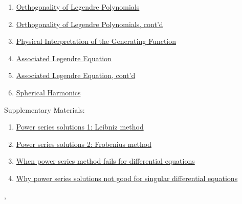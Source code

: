 \documentclass[11pt]{article}
\renewcommand{\today}{\shortmonthname[\the\month] \the \day,  \the\year}
\begin{document}
\begin{enumerate}
	\item \href{https://mp.weixin.qq.com/s/HDWGrbzTWtbSsO3xZgVeeg}{Orthogonality of Legendre Polynomials}	%
	\item \href{https://mp.weixin.qq.com/s/H7WozThNHJAqmupvJf8H-A}{Orthogonality of Legendre Polynomials, cont'd}	%
	\item \href{https://mp.weixin.qq.com/s/MLn-V3pYs6BsIvyyuxJmKQ}{Physical Interpretation of the Generating Function}	%
	\item \href{https://mp.weixin.qq.com/s/37o2x9AJsUX-z2VeGALH6A}{Associated Legendre Equation}	%
	\item \href{https://mp.weixin.qq.com/s/aU9Za7cqDEPJbBFrfZOFAg}{Associated Legendre Equation, cont'd}	%
	\item \href{https://mp.weixin.qq.com/s/aurUWxJnuPOFeSZ-_2Wz9A}{Spherical Harmonics}	%
\end{enumerate}

\begin{center}
	Supplementary Materials:
\end{center}

\vspace{-0.75cm}

\begin{enumerate}
	\item \href{https://mp.weixin.qq.com/s/x_w2FTPsPcHFCVHrc3_6lA}{Power series solutions 1: Leibniz method}
	\item \href{https://mp.weixin.qq.com/s/ExaHrz-32rKpqGUvC-SKng}{Power series solutions 2: Frobenius method}
	\item \href{https://mp.weixin.qq.com/s/mbUr64VJEBJfay9ikg5euQ}{When power series method fails for differential equations}
	\item \href{https://mp.weixin.qq.com/s/-9DhO6LS5LQlzLASXVsaEQ}{Why power series solutions not good for singular differential equations}
\end{enumerate}





%
\begin{flushright}
	\tiny \today 
\end{flushright}
\end{document}
